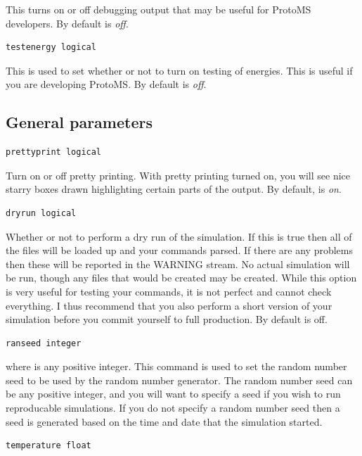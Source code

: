 \documentclass[letterpaper,10pt,english]{manual}
\begin{document}
This turns on or off debugging output that may be useful for ProtoMS developers. By default  is \emph{off}.
\begin{Verbatim}[commandchars=@\[\]]
testenergy logical
\end{Verbatim}

This is used to set whether or not to turn on testing of energies. This is useful if you are developing ProtoMS. By default  is \emph{off}.


\subsection{General parameters}
\begin{Verbatim}[commandchars=@\[\]]
prettyprint logical
\end{Verbatim}

Turn on or off pretty printing. With pretty printing turned on, you will see nice starry boxes drawn highlighting certain parts of the output. By default,  is \emph{on}.
\begin{Verbatim}[commandchars=@\[\]]
dryrun logical
\end{Verbatim}

Whether or not to perform a dry run of the simulation. If this is true then all of the files will be loaded up and your commands parsed. If there are any problems then these will be reported in the WARNING stream. No actual simulation will be run, though any files that would be created may be created. While this option is very useful for testing your commands, it is not perfect and cannot check everything. I thus recommend that you also perform a short version of your simulation before you commit yourself to full production. By default  is off.
\begin{Verbatim}[commandchars=@\[\]]
ranseed integer
\end{Verbatim}

where  is any positive integer. This command is used to set the random number seed to be used by the random number generator. The random number seed can be any positive integer, and you will want to specify a seed if you wish to run reproducable simulations. If you do not specify a random number seed then a seed is generated based on the time and date that the simulation started.
\begin{Verbatim}[commandchars=@\[\]]
temperature float
\end{Verbatim}
\end{document}
